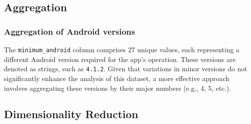 \subsection{Aggregation}
\subsubsection{Aggregation of Android versions}
The \texttt{minimum\_android} column comprises 27 unique values, each representing a different Android version required for the app's operation. These versions are denoted as strings, such as \texttt{4.1.2}. Given that variations in minor versions do not significantly enhance the analysis of this dataset, a more effective approach involves aggregating these versions by their major numbers (e.g., 4, 5, etc.).

\subsection{Dimensionality Reduction}
